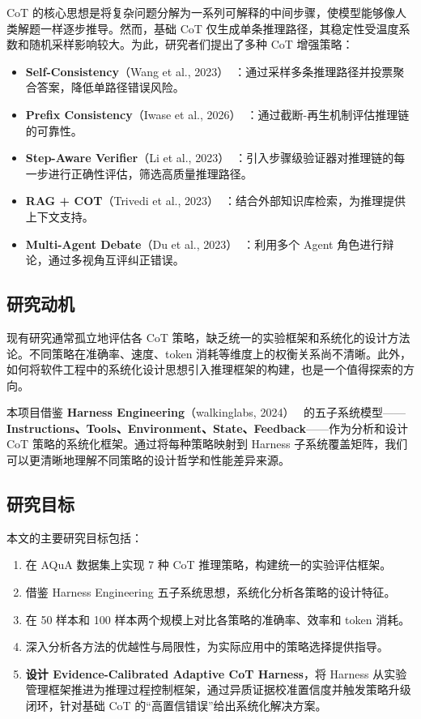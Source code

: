 \documentclass[lang=cn,a4paper,newtx]{elegantpaper}
\begin{document}
CoT 的核心思想是将复杂问题分解为一系列可解释的中间步骤，使模型能够像人类解题一样逐步推导。然而，基础 CoT 仅生成单条推理路径，其稳定性受温度系数和随机采样影响较大。为此，研究者们提出了多种 CoT 增强策略：

\begin{itemize}
  \item \textbf{Self-Consistency}（Wang et al., 2023）~\cite{wang2023sc}：通过采样多条推理路径并投票聚合答案，降低单路径错误风险。
  \item \textbf{Prefix Consistency}（Iwase et al., 2026）~\cite{yu2025pc}：通过截断-再生机制评估推理链的可靠性。
  \item \textbf{Step-Aware Verifier}（Li et al., 2023）~\cite{li2023verifier}：引入步骤级验证器对推理链的每一步进行正确性评估，筛选高质量推理路径。
  \item \textbf{RAG + COT}（Trivedi et al., 2023）~\cite{trivedi2022ragcot}：结合外部知识库检索，为推理提供上下文支持。
  \item \textbf{Multi-Agent Debate}（Du et al., 2023）~\cite{du2023mad}：利用多个 Agent 角色进行辩论，通过多视角互评纠正错误。
\end{itemize}

\subsection{研究动机}

现有研究通常孤立地评估各 CoT 策略，缺乏统一的实验框架和系统化的设计方法论。不同策略在准确率、速度、token 消耗等维度上的权衡关系尚不清晰。此外，如何将软件工程中的系统化设计思想引入推理框架的构建，也是一个值得探索的方向。

本项目借鉴 \textbf{Harness Engineering}（walkinglabs, 2024）~\cite{walkinglabs2024harness} 的五子系统模型——\textbf{Instructions、Tools、Environment、State、Feedback}——作为分析和设计 CoT 策略的系统化框架。通过将每种策略映射到 Harness 子系统覆盖矩阵，我们可以更清晰地理解不同策略的设计哲学和性能差异来源。

\subsection{研究目标}

本文的主要研究目标包括：

\begin{enumerate}
  \item 在 AQuA 数据集上实现 7 种 CoT 推理策略，构建统一的实验评估框架。
  \item 借鉴 Harness Engineering 五子系统思想，系统化分析各策略的设计特征。
  \item 在 50 样本和 100 样本两个规模上对比各策略的准确率、效率和 token 消耗。
  \item 深入分析各方法的优越性与局限性，为实际应用中的策略选择提供指导。
  \item \textbf{设计 Evidence-Calibrated Adaptive CoT Harness}，将 Harness 从实验管理框架推进为推理过程控制框架，通过异质证据校准置信度并触发策略升级闭环，针对基础 CoT 的“高置信错误”给出系统化解决方案。
\end{enumerate}
\end{document}
